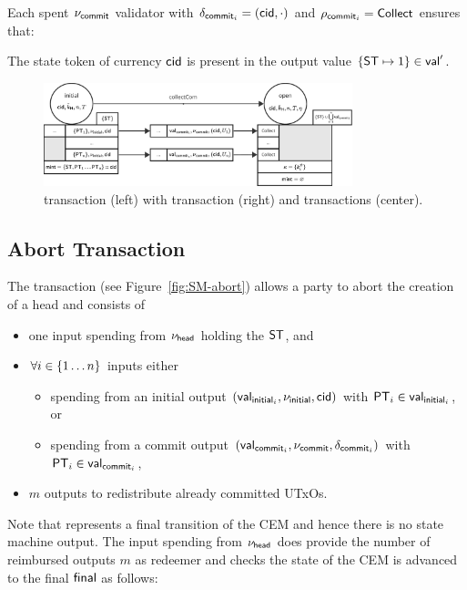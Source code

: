 \noindent Each spent $\nu_{\mathsf{commit}}$ validator with $\delta_{\mathsf{commit}_{i}} = (\mathsf{cid},\cdot)$ and $\rho_{\mathsf{commit}_{i}} = \mathsf{Collect}$ ensures that:
\begin{menumerate}
  \item The state token of currency $\mathsf{cid}$ is present in the output value
  $\{\mathsf{ST} \mapsto 1\} \in \mathsf{val}'$.
\end{menumerate}

\begin{figure}[h]
  \centering
  \includegraphics[width=0.8\textwidth]{figures/SM-collect.pdf}
  \caption{\mtxInit{} transaction (left) with \mtxCCom{} transaction (right) and
    \mtxCom{} transactions (center).}\label{fig:SM-collect}
\end{figure}

\subsection{Abort Transaction}\label{sec:abort-tx}

\begin{samepage}
The \mtxAbort{} transaction (see Figure~\ref{fig:SM-abort}) allows a
party to abort the creation of a head and consists of
\begin{itemize}
  \item one input spending from $\nu_\mathsf{head}$ holding the $\mathsf{ST}$, and
  \item $\forall i \in \{1 \dots n\}$ inputs either
    \begin{itemize}
      \item spending from an initial output $(\mathsf{val}_{\mathsf{initial}_{i}}, \nu_{\mathsf{initial}}, \mathsf{cid})$ with $\mathsf{PT}_{i} \in \mathsf{val}_{\mathsf{initial}_{i}}$, or
      \item spending from a commit output $(\mathsf{val}_{\mathsf{commit}_{i}}, \nu_{\mathsf{commit}}, \delta_{\mathsf{commit}_{i}})$ with $\mathsf{PT}_{i} \in \mathsf{val}_{\mathsf{commit}_{i}}$,
    \end{itemize}
  \item $m$ outputs to redistribute already committed UTxOs.
\end{itemize}
\end{samepage}

\noindent Note that \mtxAbort{} represents a final transition of the CEM and hence there
is no state machine output. The input spending from $\nu_\mathsf{head}$ does provide the
number of reimbursed outputs $m$ as redeemer  and checks the state of the CEM is
advanced to the final $\mathsf{final}$ as follows:

